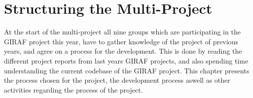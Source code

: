 \chapter{Structuring the Multi-Project}

At the start of the multi-project all nine groups which are participating in the GIRAF project this year, have to gather knowledge of the project of previous years, and agree on a process for the development.
This is done by reading the different project reports from last years GIRAF projects, and also spending time understanding the current codebase of the GIRAF project.
This chapter presents the process chosen for the project, the development process aswell as other activities regarding the process of the project.

